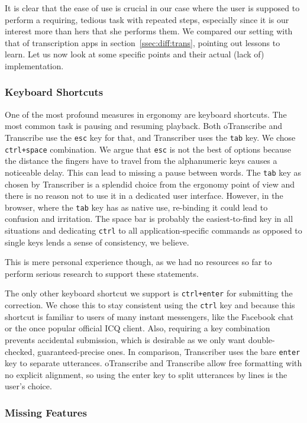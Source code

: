 \documentclass{svproc}
\begin{document}
It is clear that the ease of use is crucial in our case where the user is
supposed to perform a requiring, tedious task with repeated steps, especially
since it is our interest more than hers that she performs them. We compared our
setting with that of transcription apps in section~\ref{ssec:diff:trans},
pointing out lessons to learn. Let us now look at some specific points and their
actual (lack of) implementation.

\subsubsection{Keyboard Shortcuts}

One of the most profound measures in ergonomy are keyboard shortcuts. The most
common task is pausing and resuming playback. Both oTranscribe and Transcribe
use the \texttt{esc} key for that, and Transcriber uses the \texttt{tab} key.
We chose \texttt{ctrl+space} combination. We argue that \texttt{esc} is not the
best of options because the distance the fingers have to travel from the
alphanumeric keys causes a noticeable delay. This can lead to missing a pause
between words. The \texttt{tab} key as chosen by Transcriber is a splendid choice
from the ergonomy point of view and there is no reason not to use it in a
dedicated user interface. However, in the browser, where the \texttt{tab} key
has as native use, re-binding it could lead to confusion and irritation. The
space bar is probably the easiest-to-find key in all situations and dedicating
\texttt{ctrl} to all application-specific commands as opposed to single keys
lends a sense of consistency, we believe.

This is mere personal experience though, as we had no resources so far to
perform serious research to support these statements.

The only other keyboard shortcut we support is \texttt{ctrl+enter} for
submitting the correction. We chose this to stay consistent using the
\texttt{ctrl} key and because this shortcut is familiar to users of many instant
messengers, like the Facebook chat or the once popular official ICQ client.
Also, requiring a key combination prevents accidental submission, which is
desirable as we only want double-checked, guaranteed-precise ones. In
comparison, Transcriber uses the bare \texttt{enter} key to separate utterances.
oTranscribe and Transcribe allow free formatting with no explicit alignment, so
using the enter key to split utterances by lines is the user's choice.

\subsubsection{Missing Features}
\end{document}
